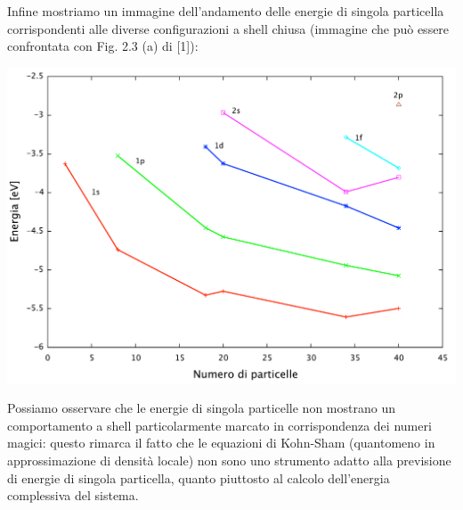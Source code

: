 \documentclass[11pt,a4paper]{article}
\begin{document}
Infine mostriamo un immagine dell'andamento delle energie di singola particella corrispondenti alle diverse configurazioni a shell chiusa (immagine che può essere confrontata con Fig. 2.3 (a) di [1]):
\newpage

\begin{center}
\includegraphics[scale=0.4]{Img/spe}
\end{center}
Possiamo osservare che le energie di singola particelle non mostrano un comportamento a shell particolarmente marcato in corrispondenza dei numeri magici: questo rimarca il fatto che le equazioni di Kohn-Sham (quantomeno in approssimazione di densità locale) non sono uno strumento adatto alla previsione di energie di singola particella, quanto piuttosto al calcolo dell'energia complessiva del sistema. 
\end{document}
